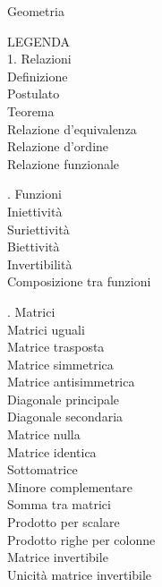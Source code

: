 \documentclass[11pt,a4paper]{article}
\newcommand{\pagina}[1]{\clearpage}
\begin{document}
\begin{center}{\LARGE Geometria}\end{center}
\pagina{1}
\begin{flushleft}
LEGENDA\\
1. Relazioni\\
\textbullet{}     Definizione\\
\textbullet{}     Postulato\\
\textbullet{}     Teorema\\
\textbullet{}     Relazione d’equivalenza\\
\textbullet{}     Relazione d’ordine\\
\textbullet{}     Relazione funzionale\\
\par{}. Funzioni\\
\textbullet{}     Iniettività\\
\textbullet{}     Suriettività\\
\textbullet{}     Biettività\\
\textbullet{}     Invertibilità\\
\textbullet{}     Composizione tra funzioni\\
\par{}. Matrici\\
\textbullet{}     Matrici uguali\\
\textbullet{}     Matrice trasposta\\
\textbullet{}     Matrice simmetrica\\
\textbullet{}     Matrice antisimmetrica\\
\textbullet{}     Diagonale principale\\
\textbullet{}     Diagonale secondaria\\
\textbullet{}     Matrice nulla\\
\textbullet{}     Matrice identica\\
\textbullet{}     Sottomatrice\\
\textbullet{}     Minore complementare\\
\textbullet{}     Somma tra matrici\\
\textbullet{}     Prodotto per scalare\\
\textbullet{}     Prodotto righe per colonne\\
\textbullet{}     Matrice invertibile\\
\textbullet{}     Unicità matrice invertibile\\
\par\smallskip

\end{flushleft}
\end{document}
